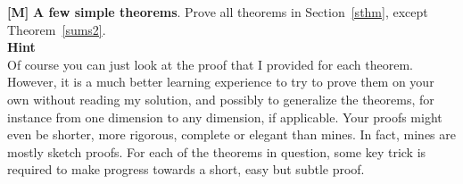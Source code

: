 \documentclass[10pt]{article}
\begin{document}
\begin{Exercise}\label{exercise2}
{\bf [M]}  {\bf A few simple theorems}. Prove all theorems in Section~\ref{sthm}, except Theorem~\ref{sums2}.\vspace{1ex} \\
{\bf Hint} \vspace{1ex}   \\
Of course you can just look at the proof that I provided for each theorem. However, it is a much better learning experience to try to prove them on your own without reading my solution, and possibly to generalize the theorems, for instance from one dimension to any dimension, if applicable. Your proofs might even be shorter, more rigorous, complete or elegant than mines. In fact, mines are mostly sketch proofs. For each of the theorems in question, some key trick is required to make progress towards a short, easy but subtle proof. 
\end{Exercise} 
\end{document}
